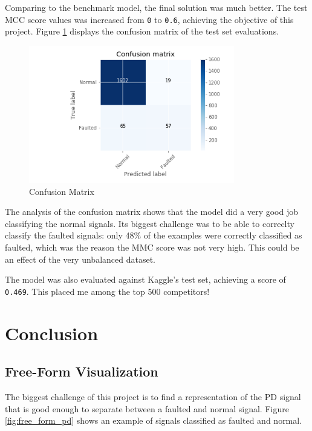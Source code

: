 \documentclass[11pt]{article}
\begin{document}
Comparing to the benchmark model, the final solution was much better.
The test MCC score values was increased from \texttt{0} to \texttt{0.6},
achieving the objective of this project. Figure \ref{fig:confusion_matrix}  displays the
confusion matrix of the test set evaluations.

\begin{figure}[h]
\centering
\includegraphics[width=0.8\textwidth]{cnf_matrix_testset.png}
\caption{Confusion Matrix}
\label{fig:confusion_matrix}
\end{figure}

The analysis of the confusion matrix shows that the model did a very
good job classifying the normal signals. Its biggest challenge was to be
able to correclty classify the faulted signals: only 48\% of the
examples were correctly classified as faulted, which was the reason the
MMC score was not very high. This could be an effect of the very
unbalanced dataset.

The model was also evaluated against Kaggle's test set, achieving a
score of \texttt{0.469}. This placed me among the top 500 competitors!

    \hypertarget{v.-conclusion}{%
\section{Conclusion}\label{v.-conclusion}}

\hypertarget{free-form-visualization}{%
\subsection{Free-Form Visualization}\label{free-form-visualization}}

The biggest challenge of this project is to find a representation of the
PD signal that is good enough to separate between a faulted and normal
signal. Figure \ref{fig:free_form_pd} shows an example of signals classified as
faulted and normal.
\end{document}
